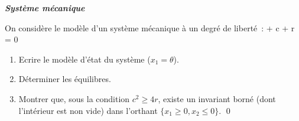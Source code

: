 \begin{exercice}{\bf \em Syst\`eme m\'ecanique}

On consid\`ere le mod\`ele d'un syst\`eme m\'ecanique \`a un degr\'e de libert\'e~:
\eqnn
\ddot \theta + c \dot \theta + r \sin \theta = 0
\eeqnn
\begin{enumerate}
\item Ecrire le mod\`ele d'\'etat du syst\`eme ($x_1 = \theta$).
\item D\'eterminer les \'equilibres.
\item Montrer que, sous la condition $c^2 \geq 4 r$, existe un invariant born\'e (dont l'int\'erieur est non vide) dans l'orthant $\{ x_1 \geq 0, x_2 \leq 0 \}$. \qed
\end{enumerate}
\end{exercice}



